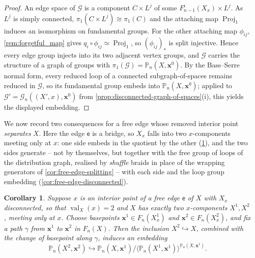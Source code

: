 \documentclass[reqno]{amsart}
\newtheorem{corollary}[theorem]{Corollary}
\theoremstyle{definition}
\newcommand\bfx{\mathbf{x}}
\newcommand\cG{\mathcal{G}}
\newcommand\sfe{\mathsf{e}}
\newcommand{\PB}{\mathbb{P}}
\newcommand{\co}[1]{\mathopen{\langle}#1\mathclose{\rangle}} %
\newcommand{\base}{\bfx^0}
\DeclareMathOperator{\val}{val}
\DeclareMathOperator{\proj}{Proj}
\numberwithin{equation}{section}
\begin{document}
\begin{proof}
An edge space of \(\cG\) is a component \(C\times L^j\) of some
\(F^i_{n-1}(X_x)\times L^j\). As \(L^j\) is simply connected,
\(\pi_1(C\times L^j)\cong\pi_1(C)\) and the attaching map
\(\proj_1\) induces an isomorphism on fundamental groups. For the
other attaching map \(\phi_{ij}\), \cref{rem:forgetful_map} gives
\(q_i\circ\phi_{ij}\simeq\proj_1\), so \((\phi_{ij})_\ast\) is
split injective. Hence every edge group injects into its two
adjacent vertex groups, and \(\cG\) carries the structure of a
graph of groups with \(\pi_1(\cG)=\PB_n(X,\base)\). By the
Bass--Serre normal form, every reduced loop of a connected
subgraph-of-spaces remains reduced in \(\cG\), so its fundamental
group embeds into \(\PB_n(X,\base)\); applied to
\(\cG'=\cG_n((X',x),\base)\) from
\cref{prop:disconnected-graph-of-spaces}(i), this yields the
displayed embedding.
\end{proof}


We now record two consequences for a free edge whose removed
interior point \emph{separates} \(X\). Here the edge \(\sfe\) is a
bridge, so \(X_x\) falls into two \(x\)-components meeting only at
\(x\): one side embeds in the quotient by the other
(\cref{cor:other-x-component-embeds}), and the two sides generate
-- not by themselves, but together with the free group of loops of
the distribution graph, realised by \emph{shuffle} braids in place of
the wrapping generators of \cref{cor:free-edge-splitting} -- with
each side and the loop group embedding
(\cref{cor:free-edge-disconnected}).

\begin{corollary}\label{cor:other-x-component-embeds}
Suppose \(x\) is an interior point of a free edge \(\sfe\) of \(X\)
with \(X_x\) disconnected, so that \(\val_X(x)=2\) and \(X\) has
exactly two \(x\)-components \(X^1,X^2\), meeting only at \(x\).
Choose basepoints \(\bfx^1\in F_n(X^1_x)\) and
\(\bfx^2\in F_n(X^2_x)\), and fix a path \(\gamma\) from
\(\bfx^1\) to \(\bfx^2\) in \(F_n(X)\). Then the inclusion
\(X^2\hookrightarrow X\), combined with the change of basepoint
along \(\gamma\), induces an embedding
\[
\PB_n(X^2,\bfx^2) \hookrightarrow
\PB_n(X,\bfx^1)\big/\co{\PB_n(X^1,\bfx^1)}^{\PB_n(X,\bfx^1)}.
\]
\end{corollary}
\end{document}
